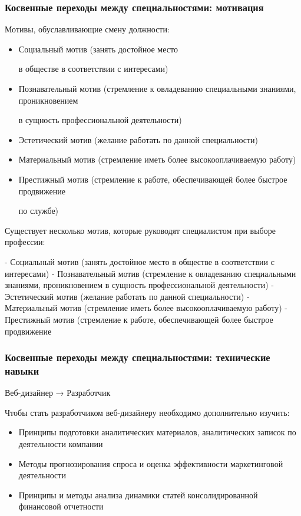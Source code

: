 \documentclass{../industrial-development}
\begin{document}
\begin{frame} \frametitle{Косвенные переходы между специальностями: мотивация }

 \begin{block}{}
Мотивы, обуславливающие смену должности:
  \end{block}
\begin{itemize}
\item Социальный мотив (занять достойное место 

в обществе в соответствии с интересами)
\item Познавательный мотив (стремление к овладеванию специальными знаниями, проникновением 

в сущность профессиональной деятельности)
\item Эстетический мотив (желание работать по данной специальности)
\item Материальный мотив (стремление иметь более высокооплачиваемую работу) 
\item Престижный мотив (стремление к работе, обеспечивающей более быстрое продвижение 

по службе)
  \end{itemize}
\end{frame}

\lecturenotes

Существует несколько мотив, которые руководят специалистом при выборе профессии:

- Социальный мотив (занять достойное место 
в обществе в соответствии с интересами)
- Познавательный мотив (стремление к овладеванию специальными знаниями, проникновением 
в сущность профессиональной деятельности)
- Эстетический мотив (желание работать по данной специальности)
- Материальный мотив (стремление иметь более высокооплачиваемую работу) 
- Престижный мотив (стремление к работе, обеспечивающей более быстрое продвижение 


\begin{frame} \frametitle{Косвенные переходы между специальностями: технические навыки }

\begin{block}{Веб-дизайнер → Разработчик }

Чтобы стать разработчиком веб-дизайнеру необходимо дополнительно изучить:
  \end{block}
\begin{itemize}
  \item Принципы подготовки аналитических материалов, аналитических записок по деятельности компании
  \item Методы прогнозирования спроса и оценка эффективности маркетинговой деятельности
\item Принципы и методы анализа динамики статей консолидированной финансовой отчетности
  \end{itemize}
\end{frame}
\end{document}
